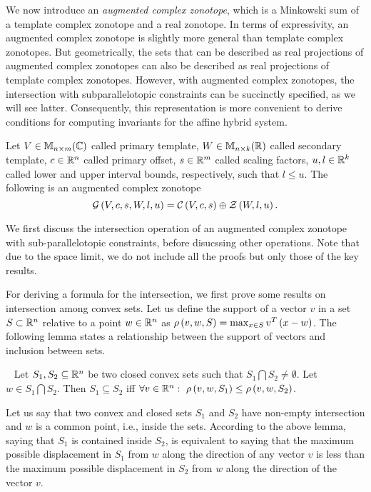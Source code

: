 We now introduce an \emph{augmented complex zonotope}, which is a
Minkowski sum of a template complex zonotope and a real zonotope. In
terms of expressivity, an augmented complex zonotope is slightly more
general than template complex zonotopes.  But geometrically, the sets
that can be described as real projections of augmented complex
zonotopes can also be described as real projections of template
complex zonotopes.  However, with augmented complex zonotopes, the
intersection with subparallelotopic constraints can be succinctly
specified, as we will see latter. Consequently, this representation is
more convenient to derive conditions for computing invariants for the
affine hybrid system.
%
\begin{definition}
Let $V\in\mat{n}{m}{C}$ called primary template, $W\in\mat{n}{k}{R}$
called secondary template, $c\in\mb{R}^n$ called primary offset,
$s\in\mb{R}^m$ called scaling factors, $u,l\in\mb{R}^k$ called lower
and upper interval bounds, respectively, such that $l\leq u$.  The
following is an augmented complex
zonotope
\begin{equation*}
\gcz{V}{c}{s}{W}{l}{u} = \cz{V}{c}{s}\oplus\zon{W}{l}{u}.
\end{equation*}
\end{definition}
%
We first discuss the intersection operation of an augmented complex
zonotope with sub-parallelotopic constraints, before disucssing other
operations.  Note that due to the space limit, we do not include all
the proofs but only those of the key results.  

For deriving a formula for the intersection, we first prove some
results on intersection among convex sets. Let us define the support
of a vector $v$ in a set $S\subset\realset^n$ relative to a point
$w\in\realset^n$ as $\support{w}{v}{S}=\max_{x\in S}v^T\lt(x-w\rt)$.
The following lemma states a relationship between the support of
vectors and inclusion between sets.
%
\begin{lemma}~\label{supp-inclusion}
Let $S_1,S_2\subseteq \realset^n$ be two closed convex sets such that
$S_1\bigcap S_2\neq \emptyset$.  Let $w\in S_1\bigcap S_2$.
Then $S_1\subseteq S_2$ iff $\forall
v\in\realset^n:~\support{w}{v}{S_1}\leq \support{w}{v}{S_2}$.
\end{lemma}
Let us say that two convex and closed sets $S_1$ and $S_2$ have
non-empty intersection and $w$ is a common point, i.e., inside the
sets.  According to the above lemma, saying that $S_1$ is contained
inside $S_2$, is equivalent to saying that the maximum possible
displacement in $S_1$ from $w$ along the direction of any
vector $v$ is less than the maximum possible displacement in $S_2$
from $w$ along the direction of the vector $v$.


